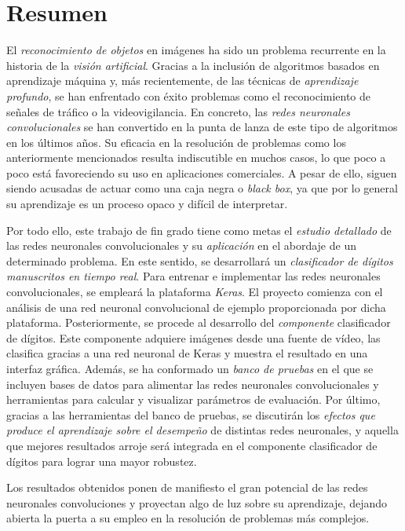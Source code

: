 \chapter*{Resumen}
El \emph{reconocimiento de objetos} en imágenes ha sido un problema recurrente en la historia de la \emph{visión artificial}. Gracias a la inclusión de algoritmos basados en aprendizaje máquina y, más recientemente, de las técnicas de \emph{aprendizaje profundo}, se han enfrentado con éxito problemas como el reconocimiento de señales de tráfico o la videovigilancia. En concreto, las \emph{redes neuronales convolucionales} se han convertido en la punta de lanza de este tipo de algoritmos en los últimos años. Su eficacia en la resolución de problemas como los anteriormente mencionados resulta indiscutible en muchos casos, lo que poco a poco está favoreciendo su uso en aplicaciones comerciales. A pesar de ello, siguen siendo acusadas de actuar como una caja negra o \emph{black box}, ya que por lo general su aprendizaje es un proceso opaco y difícil de interpretar.

Por todo ello, este trabajo de fin grado tiene como metas el \emph{estudio detallado} de las redes neuronales convolucionales y su \emph{aplicación} en el abordaje de un determinado problema. En este sentido, se desarrollará un \emph{clasificador de dígitos manuscritos en tiempo real}. Para entrenar e implementar las redes neuronales convolucionales, se empleará la plataforma \emph{Keras}. El proyecto comienza con el análisis de una red neuronal convolucional de ejemplo proporcionada por dicha plataforma. Posteriormente, se procede al desarrollo del \emph{componente} clasificador de dígitos. Este componente adquiere imágenes desde una fuente de vídeo, las clasifica gracias a una red neuronal de Keras y muestra el resultado en una interfaz gráfica. Además, se ha conformado un \emph{banco de pruebas} en el que se incluyen bases de datos para alimentar las redes neuronales convolucionales y herramientas para calcular y visualizar parámetros de evaluación. Por último, gracias a las herramientas del banco de pruebas, se discutirán los \emph{efectos que produce el aprendizaje sobre el desempeño} de distintas redes neuronales, y aquella que mejores resultados arroje será integrada en el componente clasificador de dígitos para lograr una mayor robustez.

Los resultados obtenidos ponen de manifiesto el gran potencial de las redes neuronales convoluciones y proyectan algo de luz sobre su aprendizaje, dejando abierta la puerta a su empleo en la resolución de problemas más complejos.